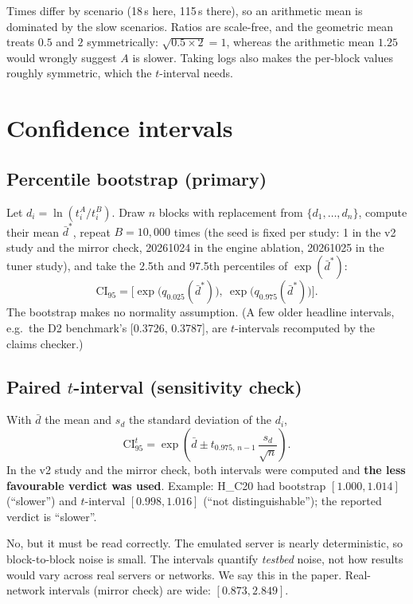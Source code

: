 \begin{doubt}
Times differ by scenario (18\,s here, 115\,s there), so an arithmetic mean is dominated by the slow scenarios. Ratios are scale-free, and the geometric mean treats $0.5$ and $2$ symmetrically: $\sqrt{0.5\times2}=1$, whereas the arithmetic mean $1.25$ would wrongly suggest $A$ is slower. Taking logs also makes the per-block values roughly symmetric, which the $t$-interval needs.
\end{doubt}

\section{Confidence intervals}
\subsection{Percentile bootstrap (primary)}
Let $d_i = \ln(t_i^A/t_i^B)$. Draw $n$ blocks with replacement from $\{d_1,\dots,d_n\}$, compute their mean $\bar d^{*}$, repeat $B=10{,}000$ times (the seed is fixed per study: 1 in the v2 study and the mirror check, 20261024 in the engine ablation, 20261025 in the tuner study), and take the 2.5th and 97.5th percentiles of $\exp(\bar d^{*})$:
\begin{equation}
\text{CI}_{95} = \Big[\exp\big(q_{0.025}(\bar d^{*})\big),\ \exp\big(q_{0.975}(\bar d^{*})\big)\Big].
\end{equation}
The bootstrap makes no normality assumption. (A few older headline intervals, e.g.\ the D2 benchmark's [0.3726, 0.3787], are $t$-intervals recomputed by the claims checker.)

\subsection{Paired $t$-interval (sensitivity check)}
With $\bar d$ the mean and $s_d$ the standard deviation of the $d_i$,
\begin{equation}
\text{CI}_{95}^{t} = \exp\!\left(\bar d \pm t_{0.975,\,n-1}\,\frac{s_d}{\sqrt n}\right).
\end{equation}
In the v2 study and the mirror check, both intervals were computed and \textbf{the less favourable verdict was used}. Example: H\_C20 had bootstrap $[1.000, 1.014]$ (``slower'') and $t$-interval $[0.998, 1.016]$ (``not distinguishable''); the reported verdict is ``slower''.

\begin{doubt}
No, but it must be read correctly. The emulated server is nearly deterministic, so block-to-block noise is small. The intervals quantify \emph{testbed} noise, not how results would vary across real servers or networks. We say this in the paper. Real-network intervals (mirror check) are wide: $[0.873, 2.849]$.
\end{doubt}

